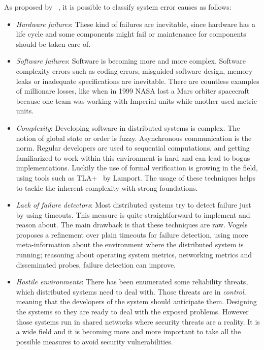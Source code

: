 As proposed by ~\cite{GuideReliable}, it is possible to classify system error
causes as follows:
\begin{itemize}
\item \textit{Hardware failures}: These kind of failures are inevitable, since
  hardware has a life cycle and some components might fail or maintenance for
  components should be taken care of.
\item \textit{Software failures}: Software is becoming more and more complex.
  Software complexity errors such as coding errors, misguided software design,
  memory leaks or inadequate specifications are inevitable. There are countless
  examples of millionare losses, like when in 1999 NASA lost a Mars orbiter
  spacecraft because one team was working with Imperial units while another used
  metric units.
\item \textit{Complexity}: Developing software in distributed systems is
  complex. The notion of global state or order is fuzzy. Asynchronous
  communication is the norm. Regular developers are used to sequential
  computations, and getting familiarized to work within this environment is hard
  and can lead to bogus implementations. Luckily the use of formal verification
  is growing in the field, using tools such as TLA+~\cite{tla} by Lamport. The
  usage of these techniques helps to tackle the inherent complexity with strong
  foundations.
\item \textit{Lack of failure detectors}: Most distributed systems try to detect
  failure just by using timeouts. This measure is quite straightforward to
  implement and reason about. The main drawback is that these techniques are
  raw. Vogels ~\cite{vogels} proposes a refinement over plain timeouts for
  failure detection, using more meta-information about the environment where
  the distributed system is running; reasoning about operating system metrics,
  networking metrics and disseminated probes, failure detection can improve.
\item \textit{Hostile environments}: There has been enumerated some reliability
  threats, which distributed systems need to deal with. Those threats are in
  \textit{control}, meaning that the developers of the system should anticipate
  them. Designing the systems so they are ready to deal with the exposed
  problems. However those systems run in shared networks where security threats
  are a reality. It is a wide field and it is becoming more and more important
  to take all the possible measures to avoid security vulnerabilities.
\end{itemize}

